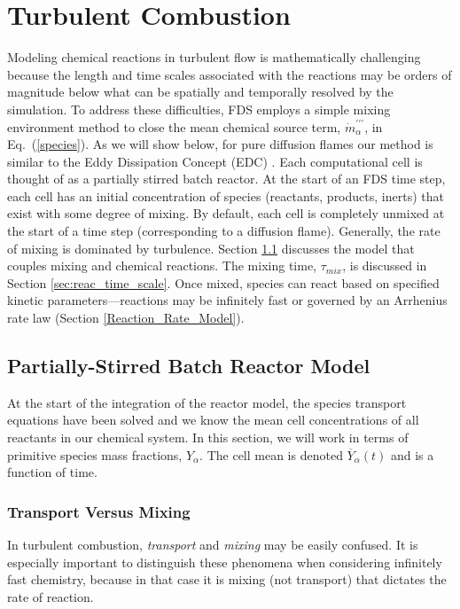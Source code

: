 \section{Turbulent Combustion}

Modeling chemical reactions in turbulent flow is mathematically challenging because the length and time scales associated with the reactions may be orders of magnitude below what can be spatially and temporally resolved by the simulation. To address these difficulties, FDS employs a simple mixing environment method to close the mean chemical source term, $\dot{m}^{\prime\prime\prime}_{\alpha}$, in Eq.~(\ref{species}).  As we will show below, for pure diffusion flames our method is similar to the Eddy Dissipation Concept (EDC) \cite{Magnussen:1}. Each computational cell is thought of as a partially stirred batch reactor. At the start of an FDS time step, each cell has an initial concentration of species (reactants, products, inerts) that exist with some degree of mixing. By default, each cell is completely unmixed at the start of a time step (corresponding to a diffusion flame). Generally, the rate of mixing is dominated by turbulence. Section \ref{sec:EDC} discusses the model that couples mixing and chemical reactions. The mixing time, $\tau_{mix}$, is discussed in Section \ref{sec:reac_time_scale}. Once mixed, species can react based on specified kinetic parameters---reactions may be infinitely fast or governed by an Arrhenius rate law (Section \ref{Reaction_Rate_Model}). 


\subsection{Partially-Stirred Batch Reactor Model}
\label{sec:EDC}

At the start of the integration of the reactor model, the species transport equations have been solved and we know the mean cell concentrations of all reactants in our chemical system.  In this section, we will work in terms of primitive species mass fractions, $Y_\alpha$.  The cell mean is denoted $\overline{Y}_\alpha(t)$ and is a function of time.

\subsubsection{Transport Versus Mixing}

In turbulent combustion, \emph{transport} and \emph{mixing} may be easily confused.  It is especially important to distinguish these phenomena when considering infinitely fast chemistry, because in that case it is mixing (not transport) that dictates the rate of reaction.

